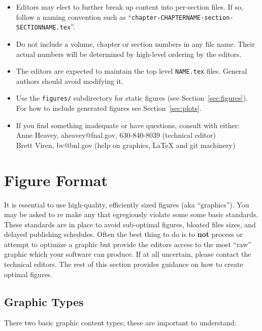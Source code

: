 \begin{itemize}
\item Editors may elect to further break up content into per-section
  files.
  If so, follow a naming convention such as
  ``\texttt{chapter-CHAPTERNAME-section-SECTIONNAME.tex}''.
\item Do not include a volume, chapter or section numbers in any file
  name.
  Their actual numbers will be determined by high-level ordering by
  the editors. 
\item The editors are expected to maintain the top level
  \texttt{NAME.tex} files. General authors should avoid modifying it.
\item Use the \texttt{figures/} subdirectory for static figures (see
  Section~\ref{sec:figures}). For how to include generated figures see
  Section~\ref{sec:plots}.
\item If you find something inadequate or have questions, consult with either: \\
  Anne Heavey, aheavey@fnal.gov, 630-840-8039 (technical editor)\\
  Brett Viren, bv@bnl.gov (help on graphics, \LaTeX{} and git machinery)
\end{itemize}


\section{Figure Format}
\label{sec:figure-format}

It is essential to use high-quality, efficiently sized figures (aka
``graphics'').
You may be asked to re make any that egregiously violate some some
basic standards.
These standards are in place to avoid sub-optimal figures, bloated
files sizes, and delayed publishing schedules.  
Often the best thing to do is to \textbf{not} process or attempt to
optimize a graphic but provide the editors access to the most ``raw''
graphic which your software can produce.
If at all uncertain, please contact the technical editors.
The rest of this section provides guidance on how to create optimal
figures.

\subsection{Graphic Types}
\label{sec:graphic-types}

There two basic graphic content types; these are important to understand:

